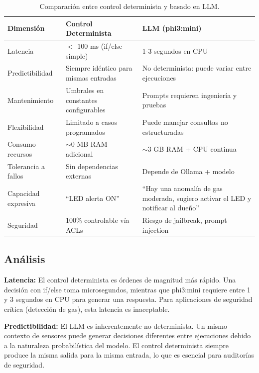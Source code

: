 \documentclass[12pt,letterpaper]{article}
\begin{document}
\begin{table}[H]
    \centering
    \caption{Comparación entre control determinista y basado en LLM.}
    \label{tab:comparativa}
    \begin{tabular}{lp{5cm}p{5cm}}
        \toprule
        \textbf{Dimensión} & \textbf{Control Determinista} & \textbf{LLM (phi3:mini)} \\
        \midrule
        Latencia & $<$ 100 ms (if/else simple) & 1-3 segundos en CPU \\
        \midrule
        Predictibilidad & Siempre idéntico para mismas entradas & No determinista: puede variar entre ejecuciones \\
        \midrule
        Mantenimiento & Umbrales en constantes configurables & Prompts requieren ingeniería y pruebas \\
        \midrule
        Flexibilidad & Limitado a casos programados & Puede manejar consultas no estructuradas \\
        \midrule
        Consumo recursos & $\sim$0 MB RAM adicional & $\sim$3 GB RAM + CPU continua \\
        \midrule
        Tolerancia a fallos & Sin dependencias externas & Depende de Ollama + modelo \\
        \midrule
        Capacidad expresiva & ``LED alerta ON'' & ``Hay una anomalía de gas moderada, sugiero activar el LED y notificar al dueño'' \\
        \midrule
        Seguridad & 100\% controlable vía ACLs & Riesgo de jailbreak, prompt injection \\
        \bottomrule
    \end{tabular}
\end{table}

\subsection{Análisis}

\textbf{Latencia:} El control determinista es órdenes de magnitud más rápido. Una decisión con if/else toma microsegundos, mientras que phi3:mini requiere entre 1 y 3 segundos en CPU para generar una respuesta. Para aplicaciones de seguridad crítica (detección de gas), esta latencia es inaceptable.

\textbf{Predictibilidad:} El LLM es inherentemente no determinista. Un mismo contexto de sensores puede generar decisiones diferentes entre ejecuciones debido a la naturaleza probabilística del modelo. El control determinista siempre produce la misma salida para la misma entrada, lo que es esencial para auditorías de seguridad.
\end{document}
